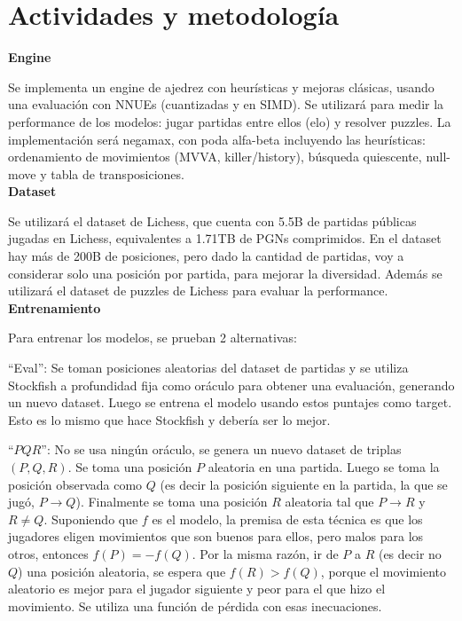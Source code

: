 \section*{Actividades y metodología}

\textbf{Engine}

Se implementa un engine de ajedrez con heurísticas y mejoras clásicas, usando una evaluación con NNUEs (cuantizadas y en SIMD). Se utilizará para medir la performance de los modelos: jugar partidas entre ellos (elo) y resolver puzzles.
La implementación será negamax, con poda alfa-beta incluyendo las heurísticas: ordenamiento de movimientos (MVVA, killer/history), búsqueda quiescente, null-move y tabla de transposiciones. \\

\textbf{Dataset}

Se utilizará el dataset de Lichess, que cuenta con 5.5B de partidas públicas jugadas en Lichess, equivalentes a 1.71TB de PGNs comprimidos. En el dataset hay más de 200B de posiciones, pero dado la cantidad de partidas, voy a considerar solo una posición por partida, para mejorar la diversidad. Además se utilizará el dataset de puzzles de Lichess para evaluar la performance. \\

\textbf{Entrenamiento}

Para entrenar los modelos, se prueban 2 alternativas:

``Eval'': Se toman posiciones aleatorias del dataset de partidas y se utiliza Stockfish a profundidad fija como oráculo para obtener una evaluación, generando un nuevo dataset. Luego se entrena el modelo usando estos puntajes como target. Esto es lo mismo que hace Stockfish y debería ser lo mejor.


\cite{dlchess:2014}

``$PQR$'': No se usa ningún oráculo, se genera un nuevo dataset de triplas $(P,Q,R)$. Se toma una posición $P$ aleatoria en una partida. Luego se toma la posición observada como $Q$ (es decir la posición siguiente en la partida, la que se jugó, $P \rightarrow Q$). Finalmente se toma una posición $R$ aleatoria tal que $P \rightarrow R$ y $R \neq Q$. Suponiendo que $f$ es el modelo, la premisa de esta técnica es que los jugadores eligen movimientos que son buenos para ellos, pero malos para los otros, entonces $f(P)=-f(Q)$. Por la misma razón, ir de $P$ a $R$ (es decir no $Q$) una posición aleatoria, se espera que $f(R) > f(Q)$, porque el movimiento aleatorio es mejor para el jugador siguiente y peor para el que hizo el movimiento. Se utiliza una función de pérdida con esas inecuaciones.
